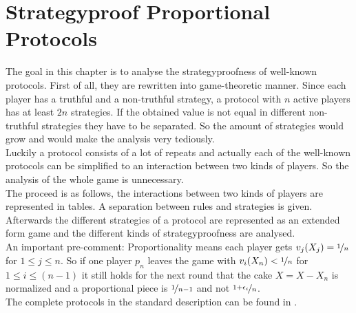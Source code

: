 \section{Strategyproof Proportional Protocols}
The goal in this chapter is to analyse the strategyproofness of well-known protocols. First of all, they are rewritten into game-theoretic manner. Since each player has a truthful and a non-truthful strategy, a protocol with $n$ active players has at least $2n$ strategies. If the obtained value is not equal in different non-truthful strategies they have to be separated. So the amount of strategies would grow and would make the analysis very tediously.\\Luckily a protocol consists of a lot of repeats and actually each of the well-known protocols can be simplified to an interaction between two kinds of players. So the analysis of the whole game is unnecessary.\\
The proceed is as follows, the interactions between two kinds of players are represented in tables. A separation between rules and strategies is given. Afterwards the different strategies of a protocol are represented as an extended form game and the different kinds of strategyproofness are analysed.\\
An important pre-comment: Proportionality means each player gets $v_j(X_j)=\nicefrac{1}{n}$ for $1\leq j\leq n$. So if one player $p_n$ leaves the game with $v_i(X_n)<\nicefrac{1}{n}$ for $1\leq i\leq (n-1)$ it still holds for the next round that the cake $X=X-X_n$ is normalized and a proportional piece is $\nicefrac{1}{n-1}$ and not $\nicefrac{1+\epsilon_i}{n}$.
\\The complete protocols in the standard description can be found in \cite{robertson:cake-cutting}.
